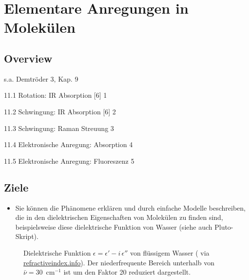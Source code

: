 \renewcommand{\lastmod}{10. September 2024}
\renewcommand{\chapterauthors}{Markus Lippitz}

\chapter{Elementare Anregungen in Molekülen}






\section{Overview}

s.a. Demtröder 3, Kap. 9


11.1 Rotation: IR Absorption [6] 1	

11.2 Schwingung: IR Absorption [6] 2	 

11.3 Schwingung: Raman Streuung 3	 

11.4 Elektronische Anregung: Absorption 4	 

11.5 Elektronische Anregung: Fluoreszenz 5	 





\section{Ziele}

\begin{itemize}
\item Sie können die Phänomene erklären und durch einfache Modelle beschreiben, die in den  dielektrischen Eigenschaften von Molekülen zu finden sind, beispielsweise diese dielektrische Funktion von Wasser (siehe auch Pluto-Skript).


\end{itemize}

\begin{figure}
\caption{Dielektrische Funktion $\epsilon = \epsilon' - i \, \epsilon''$ von flüssigem Wasser (\cite{Segelstein_water} via 
\href{https://refractiveindex.info/?shelf=main&book=H2O&page=Segelstein}{refractiveindex.info}). Der niederfrequente Bereich unterhalb von $\bar{\nu} = 30$~cm$^{-1}$ ist um den Faktor 20 reduziert dargestellt.
\label{fig:diel_water}}

\end{figure}

